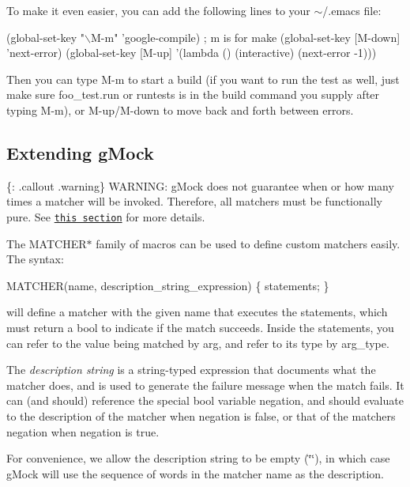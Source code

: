 To make it even easier, you can add the following lines to your {\ttfamily $\sim$/.emacs} file\+:


\begin{DoxyCode}
(global-set-key "\(\backslash\)M-m"  'google-compile)  ; m is for make
(global-set-key [M-down] 'next-error)
(global-set-key [M-up]  '(lambda () (interactive) (next-error -1)))
\end{DoxyCode}


Then you can type {\ttfamily M-\/m} to start a build (if you want to run the test as well, just make sure {\ttfamily foo\+\_\+test.\+run} or {\ttfamily runtests} is in the build command you supply after typing {\ttfamily M-\/m}), or {\ttfamily M-\/up}/{\ttfamily M-\/down} to move back and forth between errors.

\subsection*{Extending g\+Mock}

\{\+: .callout .warning\} W\+A\+R\+N\+I\+NG\+: g\+Mock does not guarantee when or how many times a matcher will be invoked. Therefore, all matchers must be functionally pure. See \href{#PureMatchers}{\tt this section} for more details.

The {\ttfamily M\+A\+T\+C\+H\+E\+R$\ast$} family of macros can be used to define custom matchers easily. The syntax\+:


\begin{DoxyCode}
MATCHER(name, description\_string\_expression) \{ statements; \}
\end{DoxyCode}


will define a matcher with the given name that executes the statements, which must return a {\ttfamily bool} to indicate if the match succeeds. Inside the statements, you can refer to the value being matched by {\ttfamily arg}, and refer to its type by {\ttfamily arg\+\_\+type}.

The {\itshape description string} is a {\ttfamily string}-\/typed expression that documents what the matcher does, and is used to generate the failure message when the match fails. It can (and should) reference the special {\ttfamily bool} variable {\ttfamily negation}, and should evaluate to the description of the matcher when {\ttfamily negation} is {\ttfamily false}, or that of the matcher\textquotesingle{}s negation when {\ttfamily negation} is {\ttfamily true}.

For convenience, we allow the description string to be empty ({\ttfamily \char`\"{}\char`\"{}}), in which case g\+Mock will use the sequence of words in the matcher name as the description.

